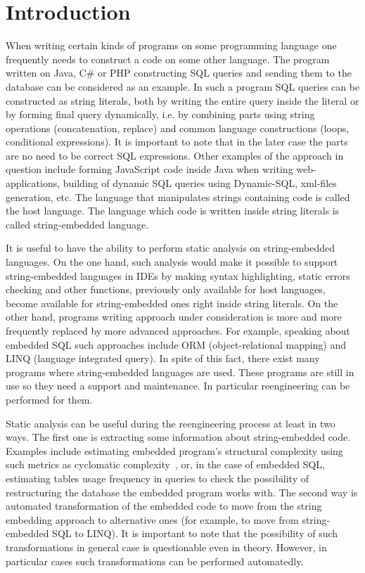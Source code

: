 \documentclass{sig-alternate-05-2015}
\begin{document}
\section{Introduction}
When writing certain kinds of programs on some programming language one frequently needs to construct a code on some other language. The program written on Java, C\# or PHP constructing SQL queries and sending them to the database can be considered as an example. In such a program SQL queries can be constructed as string literals, both by writing the entire query inside the literal or by forming final query dynamically, i.e. by combining parts using string operations (concatenation, replace) and common language constructions (loops, conditional expressions). It is important to note that in the later case the parts are no need to be correct SQL expressions. Other examples of the approach in question include forming JavaScript code inside Java when writing web-applications, building of dynamic SQL queries using Dynamic-SQL, xml-files generation, etc. The language that manipulates strings containing code is called the host language. The language which code is written inside string literals is called string-embedded language.

It is useful to have the ability to perform static analysis on string-embedded languages. On the one hand, such analysis would make it possible to support string-embedded languages in IDEs by making syntax highlighting, static errors checking and other functions, previously only available for host languages, become available for string-embedded ones right inside string literals. On the other hand, programs writing approach under consideration is more and more frequently replaced by more advanced approaches. For example, speaking about embedded SQL such approaches include ORM (object-relational mapping) and LINQ (language integrated query). In spite of this fact, there exist many programs where string-embedded languages are used. These programs are still in use so they need a support and maintenance. In particular reengineering can be performed for them. 

Static analysis can be useful during the reengineering process at least in two ways. The first one is extracting some information about string-embedded code. Examples include estimating embedded program's structural complexity using such metrics as cyclomatic complexity~\cite{cyclomatic:ref}, or, in the case of embedded SQL, estimating tables usage frequency in queries to check the possibility of restructuring the database the embedded program works with. The second way is automated transformation of the embedded code to move from the string embedding approach to alternative ones (for example, to move from string-embedded SQL to LINQ). It is important to note that the possibility of such transformations in general case is questionable even in theory. However, in particular cases such transformations can be performed automatedly.
\end{document}
